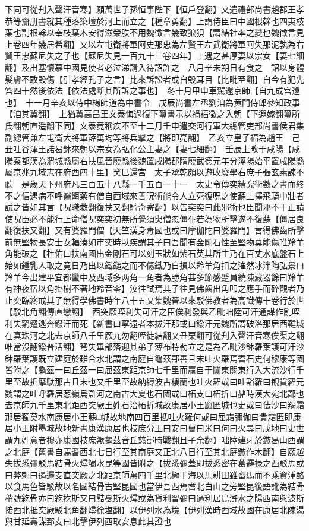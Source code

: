 下同可從刋入聲汗音寒】願萬世子孫恒事陛下【恒戶登翻】又遣禮部尚書趙郡王孝恭等齎册書就其種落築壇於河上而立之【種章勇翻】上謂侍臣曰中國根榦也四夷枝葉也割根榦以奉枝葉木安得滋榮朕不用魏徵言幾致狼狽【謂結社率之變也魏徵言見上卷四年幾居希翻】又以左屯衛將軍阿史那忠為左賢王左武衛將軍阿失那泥孰為右賢王忠蘇尼失之子也【蘇尼失見一百九十三卷四年】上遇之甚厚妻以宗女【妻七細翻】及出塞懷慕中國見使者必泣涕請入待詔許之　八月辛未朔日有食之　詔以身體髮膚不敢毁傷【引孝經孔子之言】比來訴訟者或自毁耳目【比毗至翻】自今有犯先笞四十然後依法【依法處斷其所訴之事也】　冬十月甲申車駕還京師【自九成宫還也】　十一月辛亥以侍中楊師道為中書令　戊辰尚書左丞劉洎為黄門侍郎參知政事【洎其冀翻】　上猶冀高昌王文泰悔過復下璽書示以禍褔徵之入朝【下遐嫁翻璽所氏翻朝直遥翻下同】文泰竟稱疾不至十二月壬申遣交河行軍大總管吏部尚書侯君集副總管兼左屯衛大將軍薛萬均等將兵擊之【將即亮翻】　乙亥立皇子褔為趙王　己丑吐谷渾王諾曷鉢來朝以宗女為弘化公主妻之【妻七細翻】　壬辰上畋于咸陽【咸陽秦都漢為渭城縣屬右扶風晉廢縣後魏置咸陽郡隋廢武德元年分涇陽始平置咸陽縣屬京兆九域志在府西四十里】癸巳還宫　太子承乾頗以遊畋廢學右庶子張玄素諫不聼　是歲天下州府凡三百五十八縣一千五百一十一　太史令傳奕精究術數之書而終不之信遇病不呼醫餌藥有僧自西域來善呪術能令人立死復呪之使蘇上擇飛騎中壯者試之皆如其言【呪職救翻復扶又翻騎奇寄翻】以告奕奕曰此邪術也臣聞邪不干正請使呪臣必不能行上命僧呪奕奕初無所覺須臾僧忽僵仆若為物所擊遂不復蘇【僵居良翻復扶又翻】又有婆羅門僧【天竺漢身毒國也或曰摩伽陀曰婆羅門】言得佛齒所擊前無堅物長安士女輻湊如市奕時臥疾謂其子曰吾聞有金剛石性至堅物莫能傷唯羚羊角能破之【杜佑曰扶南國出金剛石可以刻玉狀如紫石英其所生乃在百丈水底盤石上始如鍾乳人取之竟日乃出以鐵鎚之而不傷鐵乃自損以羚羊角扣之漼然冰泮陶弘景曰羚羊今出建平宜都蠻中及西域多两角一角者為勝角甚多節感蹙員繞陳藏器餘曰羚羊有神夜宿以角掛樹不著地羚音零】汝往試焉其子往見佛齒出角叩之應手而碎觀者乃止奕臨終戒其子無得學佛書時年八十五又集魏晉以來駁佛教者為高識傳十卷行於世【駁北角翻傳直戀翻】　西突厥咥利失可汗之臣俟利發與乙毗咄陸可汗通謀作亂咥利失窮蹙逃奔鏺汗而死【新書曰寧遠者本拔汗那或曰鏺汗元魏所謂破洛那居西鞬城在真珠河之北去京師八千里厥九勿翻咥徒結翻又丑栗翻可從刋入聲汗音寒俟渠之翻咄當沒翻鏺普活翻】弩失畢部落迎其弟子薄布特勒立之是為乙毗沙鉢羅葉護可汗沙鉢羅葉護既立建庭於雖合水北謂之南庭自龜茲鄯善且末吐火羅焉耆石史何穆康等國皆附之【龜茲一曰丘茲一曰屈茲東距京師七千里而贏自于闐東關東行入大流沙行千里至故折摩馱那古且末也又千里至故納縳波古樓蘭也吐火羅或曰吐豁羅曰覩貨羅元魏謂之吐呼羅居葱嶺烏滸河之南古大夏也石國或曰柘支曰柘折曰赭時漢大宛北鄙也去京師九千里東北距西突厥王姓石治柘折城故康居小王窳匿城也史或曰佉沙曰羯霜那居獨莫水南康居小王蘇□城故地南四百里抵吐火羅何或曰屈霜彌伽曰貴霜匿即康居小王附墨城故地新書康漢康居也枝庶分王曰安曰曹曰米曰何曰火尋曰戊地曰史世謂九姓意者穆亦康國枝庶歟龜茲音丘慈鄯時戰翻且子余翻】咄陸建牙於鏃曷山西謂之北庭【舊書自焉耆西北七日行至其南庭又正北八日行至其北庭鏃作木翻】自厥越失拔悉彌駁馬結骨火燖觸水昆等國皆附之【拔悉彌蓋即拔悉密在葛邏禄之西駁馬或曰弊刺曰遏邏支直突厥之北距京師萬四千里北極于海以馬耕田雖畜馬而不乘資湩酪以食馬色皆駁故以名國結骨古堅昆國也當伊吾西焉耆北白山之旁堅昆後語訛為結骨稍號紇骨亦曰紇扢斯又曰黠戞斯火燖或為貨利習彌曰過利居烏滸水之陽西南與波斯接西北抵突厥駁北角翻燖徐塩翻】以伊列水為境【伊列漢時西域故國在康居北陳湯與甘延壽謀郅支曰北擊伊列西取安息此其證也　